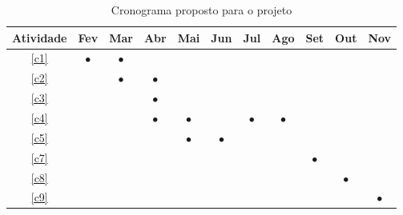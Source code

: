 \begin{table}[h]

\renewcommand{\arraystretch}{1}
\setlength\tabcolsep{3pt}
\begin{center}
\begin{tabular}{| c | c | c | c | c | c | c | c | c | c | c |}
\hline

Atividade &Fev &Mar &Abr &Mai &Jun &Jul &Ago &Set &Out &Nov \\ \hline \hline
\ref{c1}   &$\bullet$ &$\bullet$ & & & & & & & & \\ \hline
\ref{c2}   & &$\bullet$ &$\bullet$ & & & & & & & \\ \hline
\ref{c3}   & & &$\bullet$ & & & & & & & \\ \hline
\ref{c4}   & & &$\bullet$ &$\bullet$ & &$\bullet$ &$\bullet$ & & & \\ \hline
\ref{c5}   & & & &$\bullet$ &$\bullet$ & & & & & \\ \hline
\ref{c7}   & & & & & & & &$\bullet$ & & \\ \hline
\ref{c8}   & & & & & & & & &$\bullet$ & \\ \hline
\ref{c9}   & & & & & & & & & &$\bullet$ \\ 
\hline
\end{tabular}
\end{center}
\caption{Cronograma proposto para o projeto}
\label{tab:cronograma}
\end{table}
